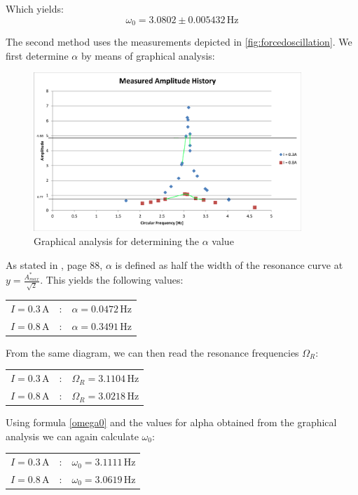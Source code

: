 \documentclass{scrreprt}
\newcommand{\unit}[1]{\ensuremath{\, \mathrm{#1}}}
\begin{document}
Which yields:
\begin{equation}
\omega_0 = 3.0802 \pm 0.005432 \unit{Hz}
\end{equation}

The second method uses the measurements depicted in \ref{fig:forcedoscillation}.
We first determine $\alpha$ by means of graphical analysis:

\begin{figure}[H]
	\centering
  \includegraphics[width=0.9\textwidth]{diag/Width_measurement.png}
	\caption{Graphical analysis for determining the $\alpha$ value}
	\label{fig:graphical}
\end{figure}

As stated in \cite{physcript13}, page 88, $\alpha$ is defined as half the width of the resonance curve at $y=\frac{A^*_{max}}{\sqrt{2}}$. This yields the following values:

\begin{table}[H]
\center
\begin{tabular}{lcl}
$I = 0.3 \unit{A}$ &:& $\alpha = 0.0472\unit{Hz}$\\
$I = 0.8 \unit{A}$ &:& $\alpha = 0.3491\unit{Hz}$
\end{tabular}
\end{table}

From the same diagram, we can then read the resonance frequencies $\Omega_R$:

\begin{table}[H]
\center
\begin{tabular}{lcl}
$I = 0.3 \unit{A}$ &:& $\Omega_R = 3.1104\unit{Hz}$\\
$I = 0.8 \unit{A}$ &:& $\Omega_R = 3.0218\unit{Hz}$
\end{tabular}
\end{table}

Using formula \ref{omega0} and the values for alpha obtained from the graphical analysis we can again calculate $\omega_0$:
\begin{table}[H]
\center
\begin{tabular}{lcl}
$I = 0.3 \unit{A}$ &:& $\omega_0 = 3.1111\unit{Hz}$\\
$I = 0.8 \unit{A}$ &:& $\omega_0 = 3.0619 \unit{Hz}$
\end{tabular}
\end{table}
\end{document}
